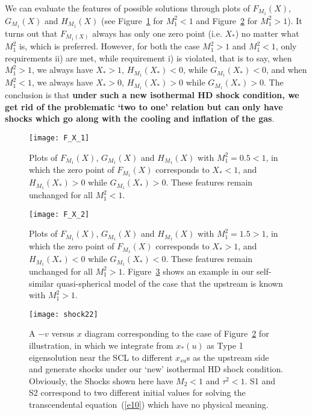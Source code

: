 \documentclass[fleqn,usenatbib]{mnras}
\begin{document}
We can evaluate the features of possible solutions through plots of $F_{M_{1}}(X)$, $G_{M_{1}}(X)$ and $H_{M_{1}}(X)$ (see Figure~\ref{1} for $M_{1}^{2}<1$ and Figure~\ref{2} for $M_{1}^{2}>1$). It turns out that $F_{M_{1}(X)}$ always has only one zero point (i.e. $X_{*}$) no matter what $M_{1}^{2}$ is, which is preferred. However, for both the case $M_{1}^{2}>1$ and $M_{1}^{2}<1$, only requirements ii) are met, while requirement i) is violated, that is to say, when $M_{1}^{2}>1$, we always have $X_{*}>1$, $H_{M_{1}}(X_{*})<0$, while $G_{M_{1}}(X_{*})<0$, and when $M_{1}^{2}<1$, we always have $X_{*}>0$, $H_{M_{1}}(X_{*})>0$ while $G_{M_{1}}(X_{*})>0$. The conclusion is that \textbf{under such a new isothermal HD shock condition, we get rid of the problematic `two to one' relation but can only have shocks which go along with the cooling and inflation of the gas}.
\begin{figure}
\centering
\texttt{[image: F\_X\_1]}
\caption{Plots of $F_{M_{1}}(X)$, $G_{M_{1}}(X)$ and $H_{M_{1}}(X)$ with $M_{1}^{2}=0.5<1$, in which the zero point of $F_{M_{1}}(X)$ corresponds to $X_{*}<1$, and $H_{M_{1}}(X_{*})>0$ while $G_{M_{1}}(X_{*})>0$. These features remain unchanged for all $M_{1}^{2}<1$.}
\label{1}
\end{figure}

\begin{figure}
\centering
\texttt{[image: F\_X\_2]}
\caption{Plots of $F_{M_{1}}(X)$, $G_{M_{1}}(X)$ and $H_{M_{1}}(X)$ with $M_{1}^{2}=1.5>1$, in which the zero point of $F_{M_{1}}(X)$ corresponds to $X_{*}>1$, and $H_{M_{1}}(X_{*})<0$ while $G_{M_{1}}(X_{*})<0$. These features remain unchanged for all $M_{1}^{2}>1$. Figure~\ref{n1} shows an example in our self-similar quasi-spherical model of the case that the upstream is known with $M_{1}^{2}>1$.}
\label{2}
\end{figure}

\begin{figure}
\centering
\texttt{[image: shock22]}
\caption{A $-v$ versus $x$ diagram corresponding to the case of Figure~\ref{2} for illustration, in which we integrate from $x_{*}(u)$ as Type 1 eigensolution near the SCL to different $x_{su}$s as the upstream side and generate shocks under our `new' isothermal HD shock condition. Obviously, the Shocks shown here have $M_{2}<1$ and $\tau^{2}<1$. S1 and S2 correspond to two different initial values for solving the transcendental equation~(\ref{e10}) which have no physical meaning.}
\label{n1}
\end{figure}
\end{document}
